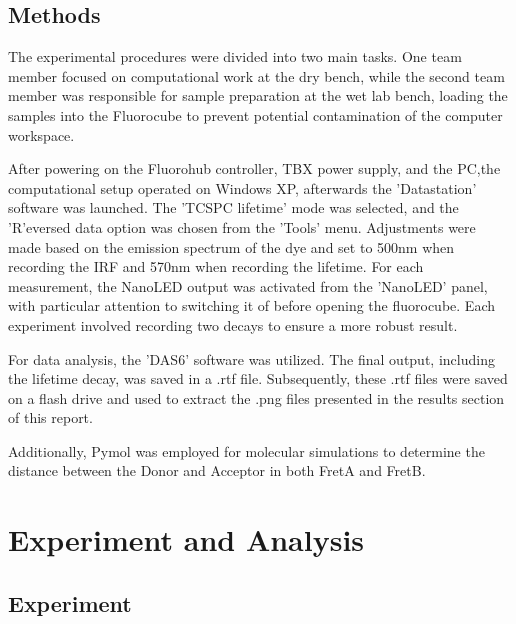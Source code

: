 \documentclass[a4paper,english,12pt,bibliography=totoc]{scrreprt}
\begin{document}
\section{Methods}
\label{sec:methods}

The experimental procedures were divided into two main tasks. One team member focused on computational work at the dry bench, while the second team member was responsible for sample preparation at the wet lab bench, loading the samples into the Fluorocube to prevent potential contamination of the computer workspace.

After powering on the Fluorohub controller, TBX power supply, and the PC,the computational setup operated on Windows XP, afterwards the 'Datastation' software was launched. The 'TCSPC lifetime' mode was selected, and the 'R'eversed data option was chosen from the 'Tools' menu. Adjustments were made based on the emission spectrum of the dye and set to 500nm when recording the IRF and 570nm when recording the lifetime. For each measurement, the NanoLED output was activated from the 'NanoLED' panel, with particular attention to switching it of before opening the fluorocube. Each experiment involved recording two decays to ensure a more robust result.

For data analysis, the 'DAS6' software was utilized. The final output, including the lifetime decay, was saved in a .rtf file. Subsequently, these .rtf files were saved on a flash drive and used to extract the .png files presented in the results section of this report.

Additionally, Pymol was employed for molecular simulations to determine the distance between the Donor and Acceptor in both FretA and FretB.

\chapter{Experiment and Analysis}
\label{cha:experimenandanalysis}  



\section{Experiment}
\label{sec:experiment} 
\end{document}
